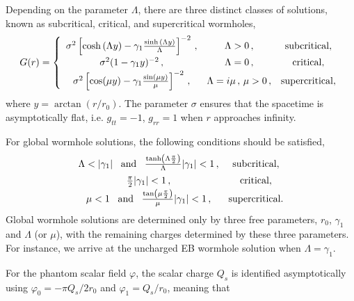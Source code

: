 \documentclass[11pt,a4paper]{article}
\begin{document}
Depending on the parameter $\Lambda$, there are three distinct classes of solutions, known as subcritical, critical, and supercritical wormholes,
%
\begin{equation}
G(r)
= \left\{
\begin{array}{ccc} 
 {\sigma^2} \left[\cosh{(\Lambda y)}-\gamma_1\frac{\sinh{(\Lambda y)}} {\Lambda}\right]^{{-2}}  \, ,
%
& \Lambda > 0 \, , &\rm{subcritical} ,\\[5pt]
 {\sigma^2} (1-\gamma_1y)^{{-2}} \, ,
%
& \Lambda = 0 \, , &\rm{critical}, \\[2pt]
{\sigma^2} \left[ \cos(\mu y) - \gamma_1\frac{\sin(\mu y)}{\mu} \right]^{{-2}} \, ,
%
& {\Lambda=i\mu\, ,\,\mu >0} \, , &\rm{supercritical},
\end{array} 
\right.
\label{G_exp}
\end{equation}
%
where $y=\arctan{({r}/{r_0})}$. 
The parameter $\sigma$ ensures that the spacetime is asymptotically flat, i.e. $g_{tt}=-1$, $g_{rr}=1$ when $r$ approaches infinity. 

For global wormhole solutions, the following conditions should be satisfied, 
\begin{equation}
\left.
\begin{array}{cc}
  {\Lambda < |\gamma_1|} \,\,\, \hbox{ and } \,\,\,
  \frac{\tanh\left(\Lambda\frac{\pi}{2}\right)}{\Lambda} |\gamma_1| < 1 \, ,
& \hbox{subcritical},\\[5pt]
  \frac{\pi}{2}|\gamma_1| < 1 \, ,
& \hbox{critical},\\[2pt]
  \mu < 1 \,\,\, \hbox{ and } \,\,\,
  \frac{\tan\left(\mu\frac{\pi}{2}\right)}{\mu} |\gamma_1| < 1 \, ,
& \hbox{supercritical}.
\end{array} 
\right.
\label{cases2}
\end{equation}
Global wormhole solutions are determined only by three free parameters, 
$r_0$, $\gamma_1$ and $\Lambda$ (or $\mu$),
with the remaining
charges 
determined by these three parameters.
For instance, we arrive at the uncharged EB wormhole solution  
when $\Lambda=\gamma_1$.

For the phantom scalar field $\varphi$, the scalar charge $Q_s$ is identified asymptotically using
$\varphi_0=-\pi Q_s/2 r_0$ and $\varphi_1=Q_s/r_0$, meaning that
\end{document}
